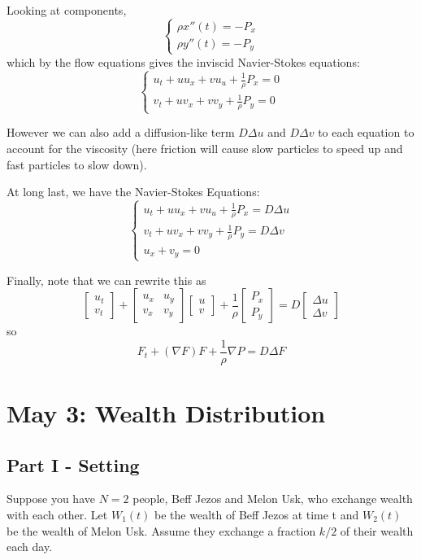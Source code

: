 \documentclass[12pt]{article}
\begin{document}
Looking at components, 
\[\begin{cases}
    \rho x''(t) = -P_x\\
    \rho y''(t) = -P_y
\end{cases}\]
which by the flow equations gives the inviscid Navier-Stokes equations:
\[\begin{cases}
    u_t + uu_x + vu_u + \frac{1}{\rho}P_x = 0\\
    v_t + uv_x + vv_y + \frac{1}{\rho}P_y = 0 
\end{cases}\]

However we can also add a diffusion-like term $D\Delta u$ and $D\Delta v$ to each equation to account for the viscosity (here friction will cause slow particles to speed up and fast particles to slow down). 

At long last, we have the Navier-Stokes Equations:
\[\begin{cases}
    u_t + uu_x + vu_u + \frac{1}{\rho}P_x = D\Delta u\\
    v_t + uv_x + vv_y + \frac{1}{\rho}P_y = D\Delta v\\
    u_x + v_y = 0
\end{cases}\]

Finally, note that we can rewrite this as 
\[\begin{bmatrix}
    u_t\\v_t
\end{bmatrix} + \begin{bmatrix}
    u_x & u_y\\
    v_x &v_y
\end{bmatrix}\begin{bmatrix}
    u\\v
\end{bmatrix} + \frac{1}{\rho} \begin{bmatrix}
    P_x\\P_y
\end{bmatrix} = D\begin{bmatrix}
    \Delta u\\ \Delta v
\end{bmatrix}\]
so 
\[\boxed{F_t + (\nabla F)F + \frac{1}{\rho} \nabla P = D\Delta F}\]

\section{May 3: Wealth Distribution}
\subsection*{Part I - Setting}
Suppose you have $N=2$ people, Beff Jezos and Melon Usk, who exchange wealth with each other. Let $W_1(t)$ be the wealth of Beff Jezos at time t and $W_2(t)$ be the wealth of Melon Usk. Assume they exchange a fraction $k/2$ of their wealth each day.
\end{document}

